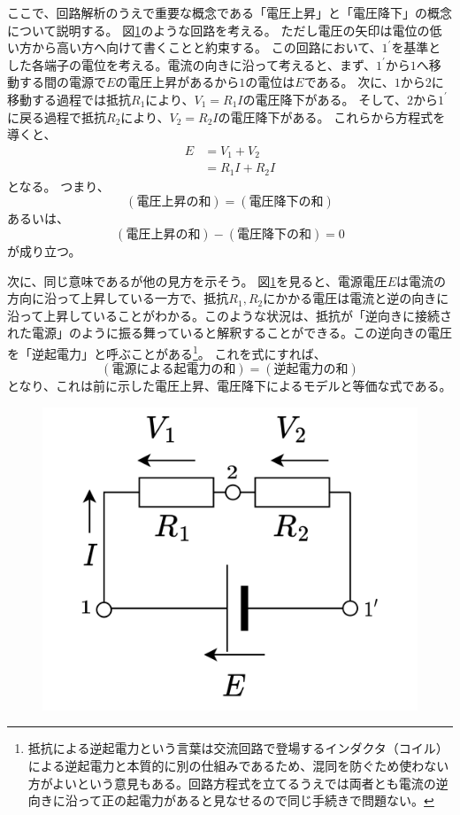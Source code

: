 \documentclass{ltjsreport}
\begin{document}
ここで、回路解析のうえで重要な概念である「電圧上昇」と「電圧降下」の概念について説明する。
図\ref{fig:voltup_down}のような回路を考える。
ただし電圧の矢印は電位の低い方から高い方へ向けて書くことと約束する。
この回路において、$1^\prime$を基準とした各端子の電位を考える。電流の向きに沿って考えると、まず、$1^\prime$から$1$へ移動する間の電源で$E$の電圧上昇があるから$1$の電位は$E$である。
次に、$1$から$2$に移動する過程では抵抗$R_1$により、$V_1=R_1I$の電圧降下がある。
そして、$2$から$1^\prime$に戻る過程で抵抗$R_2$により、$V_2=R_2I$の電圧降下がある。
これらから方程式を導くと、
\begin{align} 
  E &= V_1+V_2\\ \label{eq:ohm2}
    &= R_1I +R_2I
\end{align}
となる。
つまり、
\[
  (電圧上昇の和) = (電圧降下の和)
\]
あるいは、
\[
  (電圧上昇の和)-(電圧降下の和) =0
\]
が成り立つ。

次に、同じ意味であるが他の見方を示そう。
図\ref{fig:voltup_down}を見ると、電源電圧$E$は電流の方向に沿って上昇している一方で、抵抗$R_1, R_2$にかかる電圧は電流と逆の向きに沿って上昇していることがわかる。このような状況は、抵抗が「逆向きに接続された電源」のように振る舞っていると解釈することができる。この逆向きの電圧を「逆起電力」と呼ぶことがある\footnote{抵抗による逆起電力という言葉は交流回路で登場するインダクタ（コイル）による逆起電力と本質的に別の仕組みであるため、混同を防ぐため使わない方がよいという意見もある。回路方程式を立てるうえでは両者とも電流の逆向きに沿って正の起電力があると見なせるので同じ手続きで問題ない。}。
これを式にすれば、
\[
  (電源による起電力の和) = (逆起電力の和)
\]
となり、これは前に示した電圧上昇、電圧降下によるモデルと等価な式である。



\begin{figure}[tb]
  \centering
  \includegraphics[keepaspectratio, scale=0.07]
       {img/ohm2.drawio.png}
  \caption{}
  \label{fig:voltup_down}
 \end{figure}
\end{document}
